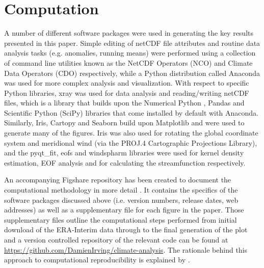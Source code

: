 \section{Computation}

A number of different software packages were used in generating the key results presented in this paper. Simple editing of netCDF file attributes and routine data analysis tasks (e.g. anomalies, running means) were performed using a collection of command line utilities known as the NetCDF Operators (NCO) and Climate Data Operators (CDO) respectively, while a Python distribution called Anaconda was used for more complex analysis and visualization. With respect to specific Python libraries, xray was used for data analysis and reading/writing netCDF files, which is a library that builds upon the Numerical Python \citep[NumPy;][]{VanDerWalt2011}, Pandas and Scientific Python (SciPy) libraries that come installed by default with Anaconda. Similarly, Iris, Cartopy and Seaborn build upon Matplotlib \citep[the default Python plotting library;][]{Hunter2007} and were used to generate many of the figures. Iris was also used for rotating the global coordinate system and meridional wind (via the PROJ.4 Cartographic Projections Library), and the pyqt\_fit, eofs and windspharm libraries were used for kernel density estimation, EOF analysis and for calculating the streamfunction respectively.

An accompanying Figshare repository has been created to document the computational methodology in more detail \citep{Irving2016a}. It contains the specifics of the software packages discussed above (i.e. version numbers, release dates, web addresses) as well as a supplementary file for each figure in the paper. Those supplementary files outline the computational steps performed from initial download of the ERA-Interim data through to the final generation of the plot and a version controlled repository of the relevant code can be found at \url{https://github.com/DamienIrving/climate-analysis}. The rationale behind this approach to computational reproducibility is explained by \citet{Irving2016}.
